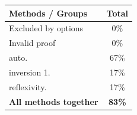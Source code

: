 \begin{table}
\centering
\begin{tabular}{lc}
\toprule
\textbf{Methods / Groups} & \textbf{Total} \\
\midrule
Excluded by options & 0\% \\
Invalid proof & 0\% \\
auto. & 67\% \\
inversion 1. & 17\% \\
reflexivity. & 17\% \\
\textbf{All methods together} & \textbf{83\%} \\
\bottomrule
\end{tabular}
\end{table}